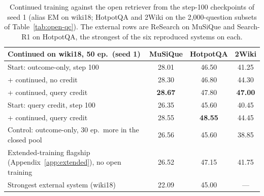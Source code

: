 \begin{table}[t]
\centering
\small
\begin{tabular}{lccc}
\toprule
Continued on wiki18, 50 ep.\ (seed 1) & MuSiQue & HotpotQA & 2Wiki \\
\midrule
Start: outcome-only, step 100      & 28.01 & 46.50 & 41.25 \\
\quad + continued, no credit       & 28.30 & 46.80 & 44.30 \\
\quad + continued, query credit    & \textbf{28.67} & 47.80 & \textbf{47.00} \\
Start: query credit, step 100      & 26.35 & 45.60 & 40.45 \\
\quad + continued, query credit    & 28.55 & \textbf{48.55} & 44.45 \\
\midrule
Control: outcome-only, 30 ep.\ more in the closed pool & 26.56 & 45.60 & 38.85 \\
Extended-training flagship (Appendix~\ref{app:extended}), no open training & 26.52 & 47.15 & 41.75 \\
Strongest external system (wiki18)  & 22.09 & 45.00 & --- \\
\bottomrule
\end{tabular}
\caption{Continued training against the open retriever from the
step-100 checkpoints of seed 1 (alias EM on wiki18; HotpotQA and 2Wiki
on the 2{,}000-question subsets of Table~\ref{tab:open-qc}). The
external rows are ReSearch on MuSiQue and Search-R1 on HotpotQA, the
strongest of the six reproduced systems on each.}
\label{tab:stage2}
\end{table}


\begin{table}[t]
\centering
\small
{}
\caption{Trajectory-level coverage versus outcome-only training on the
open corpus: means over the three explicit-seed pairs (step 100, no
open-corpus training), question-level paired McNemar $z$ pooled over
the pairs.}
\label{tab:open-pairs}
\end{table}

